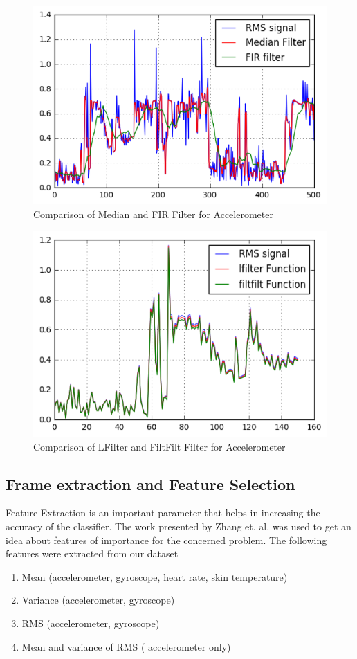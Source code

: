 \documentclass{acm_proc_article-sp}
\begin{document}
\begin{enumerate}
\begin{figure}[H]
\includegraphics[scale=0.75]{Picture1.png}
\caption{Comparison of Median and FIR Filter for Accelerometer}
\label{fig:pic1}
\end{figure}

\begin{figure}[H]
\includegraphics[scale=0.75]{Picture2.png}
\caption{Comparison of LFilter and FiltFilt Filter for Accelerometer}
\label{fig:pic2}
\end{figure}

\subsection{Frame extraction and Feature Selection}
Feature Extraction is an important parameter that helps in increasing the accuracy of the classifier. The work presented by Zhang et. al.  \cite{Zhang:2011:FSF:2318776.2318798} was used to get an idea about features of importance for the concerned problem.  
The following features were extracted from our dataset 
\begin{enumerate}
\item Mean (accelerometer, gyroscope, heart rate, skin temperature)
\item Variance (accelerometer, gyroscope)
\item RMS (accelerometer, gyroscope)
\item Mean and variance of RMS ( accelerometer only)
\end{enumerate}


\end{enumerate}
\end{document}
